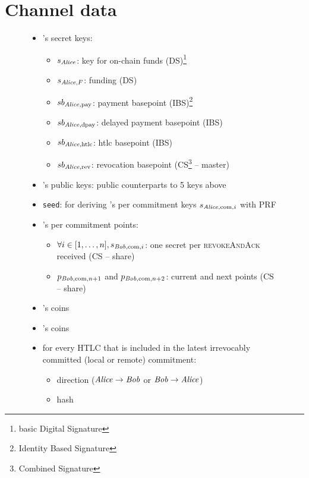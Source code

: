 \section{Channel data}
  \begin{figure}
  \begin{mdframed}
    \begin{itemize}
      \item \alice's secret keys:
      \begin{itemize}
        \item $s_{\mathit{Alice}}$: key for on-chain funds (DS)\footnote{basic Digital
        Signature}
        \item $s_{\mathit{Alice}, F}$: funding (DS)
        \item $sb_{\mathit{Alice}, \mathrm{pay}}$: payment basepoint
        (IBS)\footnote{Identity Based Signature}
        \item $sb_{\mathit{Alice}, \mathrm{dpay}}$: delayed payment basepoint (IBS)
        \item $sb_{\mathit{Alice}, \mathrm{htlc}}$: htlc basepoint (IBS)
        \item $sb_{\mathit{Alice}, \mathrm{rev}}$: revocation basepoint
        (CS\footnote{Combined Signature} -- master)
      \end{itemize}
      \item \bob's public keys: public counterparts to 5 keys above
      \item \texttt{seed}: for deriving \alice's per commitment keys $s_{\mathit{Alice},
      \mathrm{com}, i}$ with PRF
      \item \bob's per commitment points:
      \begin{itemize}
        \item $\forall i \in [1, \dots, n], s_{\mathit{Bob}, \mathrm{com}, i}$: one
        secret per \textsc{revokeAndAck} received (CS -- share)
        \item $p_{\mathit{Bob}, \mathrm{com}, n+1}$ and $p_{\mathit{Bob}, \mathrm{com}, n+2}$:
        current and next points (CS -- share)
      \end{itemize}
      \item \alice's coins
      \item \bob's coins
      \item for every HTLC that is included in the latest irrevocably committed
      (local or remote) commitment:
        \begin{itemize}
          \item direction ($\mathit{Alice} \rightarrow \mathit{Bob}$ or $\mathit{Bob} \rightarrow \mathit{Alice}$)
          \item hash

\end{itemize}
\end{itemize}
\end{mdframed}
\end{figure}
